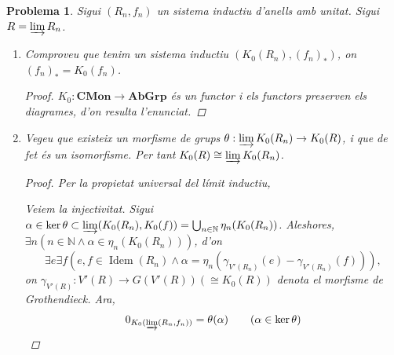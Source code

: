 \documentclass[compress]{article}
\newtheorem{problema}{Problema}
\theoremstyle{definition}
\DeclareMathOperator{\Idem}{Idem}
\begin{document}
\begin{problema}
    Sigui $(R_{n},f_{n})$ un sistema inductiu d'anells amb unitat. Sigui $R=\varinjlim R_{n}$.
    \begin{enumerate}
        \item Comproveu que tenim un sistema inductiu $(K_{0}(R_{n}),(f_{n})_{*})$, on $(f_{n})_{*}=K_{0}(f_{n})$.
        \begin{proof}
            $K_{0}:\mathbf{CMon}\rightarrow\mathbf{AbGrp}$ és un functor i els functors preserven els diagrames, d'on resulta l'enunciat.
        \end{proof}
        \item Vegeu que existeix un morfisme de grups $\theta:\varinjlim K_{0}(R_{n})\rightarrow K_{0}(R)$, i que de fet és un isomorfisme. Per tant $K_{0}(R)\cong\varinjlim K_{0}(R_{n})$.
         \begin{proof}
            Per la propietat universal del límit inductiu,
            \begin{center}
            \end{center}
            Veiem la injectivitat. Sigui $\alpha\in\ker{\theta}\subset\varinjlim(K_{0}(R_{n}),K_{0}(f))=\bigcup_{n\in\mathbb{N}}\eta_{n}(K_{0}(R_{n}))$. Aleshores, $\exists n(n\in\mathbb{N}\land\alpha\in\eta_{n}(K_{0}(R_{n})))$, d'on
            \begin{equation*}
                \exists e\exists f(e,f\in\Idem(R_{n})\land\alpha=\eta_{n}(\gamma_{V'(R_{n})}(e)-\gamma_{V'(R_{n})}(f))),
            \end{equation*}
            on $\gamma_{V'(R)}:V'(R)\rightarrow G(V'(R))(\cong K_{0}(R))$ denota el morfisme de Grothendieck. Ara,
            \begin{align*}
                0_{K_{0}(\varinjlim(R_{n},f_{n}))}
                &=\theta(\alpha)
                &\quad&\textrm{($\alpha\in\ker{\theta}$)}\\

\end{align*}
\end{proof}
\end{enumerate}
\end{problema}
\end{document}

